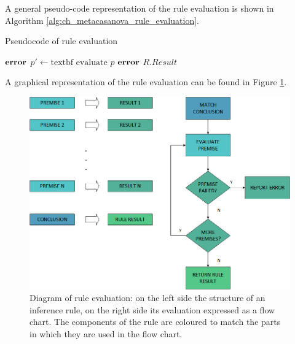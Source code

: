 A general pseudo-code representation of the rule evaluation is shown in Algorithm \ref{alg:ch_metacasanova_rule_evaluation}.

\begin{algorithm}
	\caption{Pseudocode of rule evaluation}
	\label{alg:ch_metacasanova_rule_evaluation}
	\begin{algorithmic}
			\State \Return $\text{\textbf{error}}$
		\EndIf
		  \State $p'\gets \text{textbf{ evaluate }} p$
		    \State \Return $\text{\textbf{error}}$
		  \EndIf
		\EndFor
		\State \Return $R.Result$
		\EndFunction
	\end{algorithmic}
\end{algorithm}

A graphical representation of the rule evaluation can be found in Figure \ref{fig:ch_metacasanova_rule_evaluation}.

\begin{figure}
	\centering
	\includegraphics[width = \textwidth]{Figures/chapter_metacasanova/rule_evaluation}
	\caption{Diagram of rule evaluation: on the left side the structure of an inference rule, on the right side its evaluation expressed as a flow chart. The components of the rule are coloured to match the parts in which they are used in the flow chart.}
	\label{fig:ch_metacasanova_rule_evaluation}
\end{figure}

